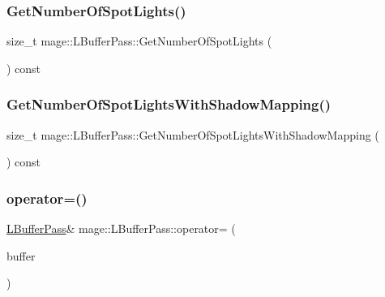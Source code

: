 \hypertarget{structmage_1_1_l_buffer_pass_a52e32579e9843f3d6cf998cbf9a3f362}{}\label{structmage_1_1_l_buffer_pass_a52e32579e9843f3d6cf998cbf9a3f362} 
\subsubsection{\texorpdfstring{Get\+Number\+Of\+Spot\+Lights()}{GetNumberOfSpotLights()}}
{\footnotesize\ttfamily size\+\_\+t mage\+::\+L\+Buffer\+Pass\+::\+Get\+Number\+Of\+Spot\+Lights (\begin{DoxyParamCaption}{ }\end{DoxyParamCaption}) const\hspace{0.3cm}{\ttfamily [noexcept]}}

\hypertarget{structmage_1_1_l_buffer_pass_a30a1b4e2147eae73633fc33bd10d5f2f}{}\label{structmage_1_1_l_buffer_pass_a30a1b4e2147eae73633fc33bd10d5f2f} 
\subsubsection{\texorpdfstring{Get\+Number\+Of\+Spot\+Lights\+With\+Shadow\+Mapping()}{GetNumberOfSpotLightsWithShadowMapping()}}
{\footnotesize\ttfamily size\+\_\+t mage\+::\+L\+Buffer\+Pass\+::\+Get\+Number\+Of\+Spot\+Lights\+With\+Shadow\+Mapping (\begin{DoxyParamCaption}{ }\end{DoxyParamCaption}) const\hspace{0.3cm}{\ttfamily [noexcept]}}

\hypertarget{structmage_1_1_l_buffer_pass_aec86026cd14a4b1609f709444bc453bd}{}\label{structmage_1_1_l_buffer_pass_aec86026cd14a4b1609f709444bc453bd} 
\subsubsection{\texorpdfstring{operator=()}{operator=()}\hspace{0.1cm}{\footnotesize\ttfamily [1/2]}}
{\footnotesize\ttfamily \hyperlink{structmage_1_1_l_buffer_pass}{L\+Buffer\+Pass}\& mage\+::\+L\+Buffer\+Pass\+::operator= (\begin{DoxyParamCaption}\item[{const \hyperlink{structmage_1_1_l_buffer_pass}{L\+Buffer\+Pass} \&}]{buffer }\end{DoxyParamCaption})\hspace{0.3cm}{\ttfamily [delete]}}

